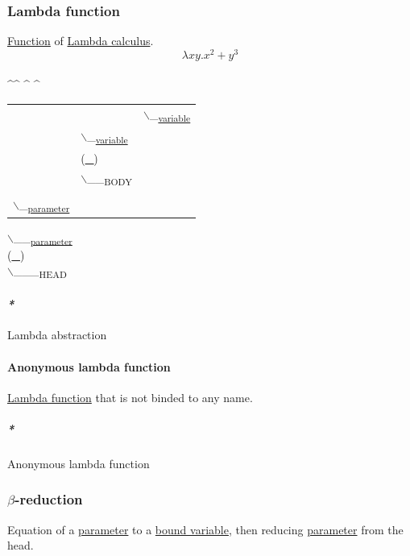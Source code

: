 \documentclass[11pt]{article}
\begin{document}
\subsubsection{\label{orgaf59855}Lambda function}
\label{sec:org798129e}
\hyperref[orge15bc14]{Function} of \hyperref[org37da5f9]{Lambda calculus}.\\
$$ \lambda x y.x^2 + y^3 $$\\
 \^{}\^{} \^{}    \^{}\\
\begin{center}
\begin{tabular}{lll}
 &  & $\backslash$_\textsubscript{\hyperref[org0b57594]{variable}}\\
 & $\backslash$_\textsubscript{\hyperref[org0b57594]{variable}}\\
 & (\uline{\uline{\_}})\\
 & $\backslash$_\_\textsubscript{BODY}\\
\\
$\backslash$_\textsubscript{\hyperref[org0e7674e]{parameter}}\\
\end{tabular}
\end{center}
  $\backslash$_\_\textsubscript{\hyperref[org0e7674e]{parameter}}\\
(\uline{\_})\\
   $\backslash$_\_\_\textsubscript{HEAD}\\

\paragraph{\emph{*}}
\label{sec:orge66399e}

\label{org0d193f3}Lambda abstraction\\

\paragraph{\label{org253aa17}Anonymous lambda function}
\label{sec:org7697daa}
\hyperref[orgaf59855]{Lambda function} that is not binded to any name.\\

\subparagraph{\emph{*}}
\label{sec:orgf373e20}

\label{org88eb8db}Anonymous lambda function\\

\subsubsection{\label{org687fe93}\(\beta\)-reduction}
\label{sec:org090da88}
Equation of a \hyperref[org0e7674e]{parameter} to a \hyperref[org887c0d3]{bound variable}, then reducing \hyperref[org0e7674e]{parameter} from the head.\\
\end{document}
